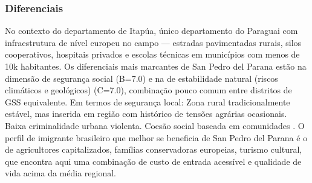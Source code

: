 \subsubsection*{Diferenciais}\label{dif-san-pedro-del-parana-0720}
No contexto do departamento de Itapúa, único departamento do Paraguai com infraestrutura de nível europeu no campo — estradas pavimentadas rurais, silos cooperativos, hospitais privados e escolas técnicas em municípios com menos de 10k habitantes. Os diferenciais mais marcantes de San Pedro del Parana estão na dimensão de segurança social (B=7.0) e na de estabilidade natural (riscos climáticos e geológicos) (C=7.0), combinação pouco comum entre distritos de GSS equivalente. Em termos de segurança local: Zona rural tradicionalmente estável, mas inserida em região com histórico de tensões agrárias ocasionais. Baixa criminalidade urbana violenta. Coesão social baseada em comunidades . O perfil de imigrante brasileiro que melhor se beneficia de San Pedro del Parana é o de agricultores capitalizados, famílias conservadoras europeias, turismo cultural, que encontra aqui uma combinação de custo de entrada acessível e qualidade de vida acima da média regional.
